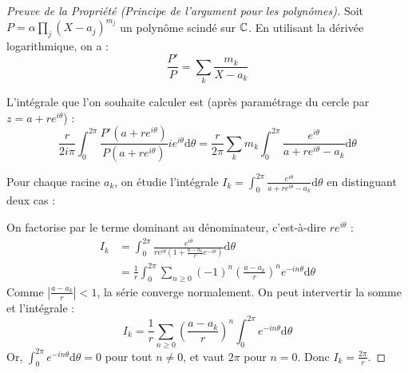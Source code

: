 \begin{proof}[Preuve de la Propriété (Principe de l'argument pour les polynômes)]
    Soit $P = \alpha \prod_{j} (X - a_j)^{m_j}$ un polynôme scindé sur $\mathbb{C}$. 
    En utilisant la dérivée logarithmique, on a :
    \[ \frac{P'}{P} = \sum_{k} \frac{m_k}{X - a_k} \]
    
    L'intégrale que l'on souhaite calculer est (après paramétrage du cercle par $z = a + r e^{i\theta}$) :
    \[ \frac{r}{2i\pi} \int_{0}^{2\pi} \frac{P'(a+r e^{i\theta})}{P(a+r e^{i\theta})} i e^{i\theta} \mathrm{d}\theta = \frac{r}{2\pi} \sum_{k} m_k \int_{0}^{2\pi} \frac{e^{i\theta}}{a + r e^{i\theta} - a_k} \mathrm{d}\theta \]
    
    Pour chaque racine $a_k$, on étudie l'intégrale $I_k = \int_{0}^{2\pi} \frac{e^{i\theta}}{a + r e^{i\theta} - a_k} \mathrm{d}\theta$ en distinguant deux cas :

    \begin{center}
    \end{center}

    
    \svspace
    On factorise par le terme dominant au dénominateur, c'est-à-dire $r e^{i\theta}$ :
    \begin{align*}
        I_k &= \int_{0}^{2\pi} \frac{e^{i\theta}}{r e^{i\theta} \left(1 + \frac{a - a_k}{r} e^{-i\theta}\right)} \mathrm{d}\theta \\
            &= \frac{1}{r} \int_{0}^{2\pi} \sum_{n \geqslant 0} (-1)^n \left(\frac{a - a_k}{r}\right)^n e^{-in\theta} \mathrm{d}\theta
    \end{align*}
    Comme $\left| \frac{a - a_k}{r} \right| < 1$, la série converge normalement. On peut intervertir la somme et l'intégrale :
    \[ I_k = \frac{1}{r} \sum_{n \geqslant 0} \left(\frac{a - a_k}{r}\right)^n \int_{0}^{2\pi} e^{-in\theta} \mathrm{d}\theta \]
    Or, $\int_{0}^{2\pi} e^{-in\theta} \mathrm{d}\theta = 0$ pour tout $n \neq 0$, et vaut $2\pi$ pour $n = 0$.
    Donc $I_k = \frac{2\pi}{r}$. 
    

\end{proof}
